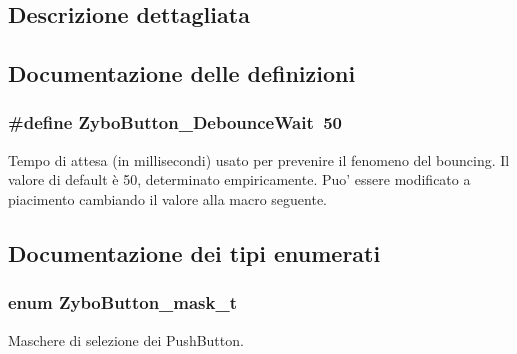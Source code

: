 \subsection{Descrizione dettagliata}


\subsection{Documentazione delle definizioni}
\hypertarget{group___zybo_button_ga8960eefa6a431f50d4fe2a2f8063da3f}{
\subsubsection[{Zybo\+Button\+\_\+\+Debounce\+Wait}]{\setlength{\rightskip}{0pt plus 5cm}\#define Zybo\+Button\+\_\+\+Debounce\+Wait~50}}\label{group___zybo_button_ga8960eefa6a431f50d4fe2a2f8063da3f}


Tempo di attesa (in millisecondi) usato per prevenire il fenomeno del bouncing. Il valore di default è 50, determinato empiricamente. Puo' essere modificato a piacimento cambiando il valore alla macro seguente. 



\subsection{Documentazione dei tipi enumerati}
\hypertarget{group___zybo_button_ga4d26a5f6cad606de534ba034e0ba42dd}{
\subsubsection[{Zybo\+Button\+\_\+mask\+\_\+t}]{\setlength{\rightskip}{0pt plus 5cm}enum {\bf Zybo\+Button\+\_\+mask\+\_\+t}}}\label{group___zybo_button_ga4d26a5f6cad606de534ba034e0ba42dd}


Maschere di selezione dei Push\+Button. 

